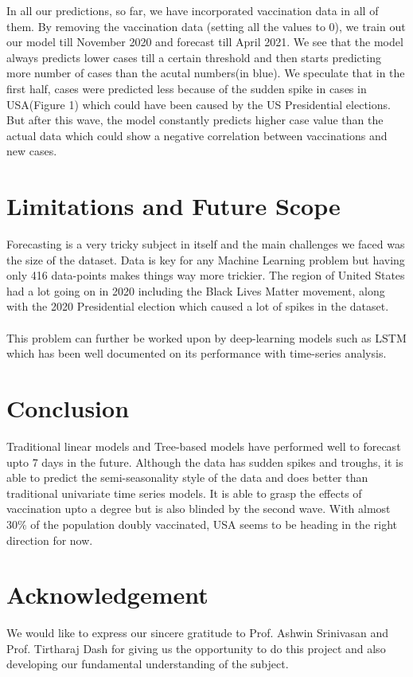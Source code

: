 \documentclass[12pt,a4paper]{article}
\begin{document}
In all our predictions, so far, we have incorporated vaccination data in all
of them. By removing the vaccination data (setting all the values to 0), we train out our model 
till November 2020 and forecast till April 2021. We see that the model always predicts 
lower cases till a certain threshold and then starts predicting more number of cases than the acutal numbers(in blue).
We speculate that in the first half, cases were predicted less because of the sudden spike in cases in USA(Figure 1)
which could have been caused by the US Presidential elections. But after this wave, the model constantly predicts higher case value than the 
actual data which could show a negative correlation between vaccinations and new cases.

\section*{Limitations and Future Scope}
Forecasting is a very tricky subject in itself and the main challenges we faced was 
the size of the dataset. Data is key for any Machine Learning problem but having only 416
data-points makes things way more trickier. The region of United States had a lot going on in 2020
including the Black Lives Matter movement, along with the 2020 Presidential election which caused a 
lot of spikes in the dataset. 
\\\\
This problem can further be worked upon by deep-learning models such as 
LSTM which has been well documented on its performance with time-series 
analysis. 

\section*{Conclusion}
Traditional linear models and Tree-based models have performed well to forecast
upto 7 days in the future. Although the data has sudden spikes and troughs, it is 
able to predict the semi-seasonality style of the data and does better than 
traditional univariate time series models. It is able to grasp the effects of vaccination
upto a degree but is also blinded by the second wave. With almost $30\%$ of the population 
doubly vaccinated, USA seems to be heading in the right direction for now.


\section*{Acknowledgement}
We would like to express our sincere gratitude to Prof. Ashwin Srinivasan and Prof. Tirtharaj
Dash for giving us the opportunity to do this project and also developing our fundamental
understanding of the subject.
\end{document}

